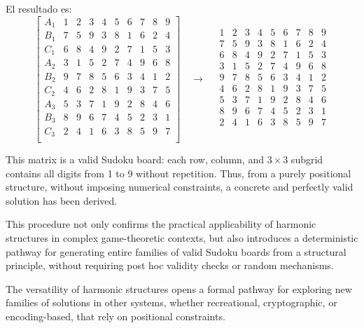 \documentclass{article}
\begin{document}
El resultado es:
\[
\left[
\begin{array}{r|ccccccccc}
A_1 & 1 & 2 & 3 & 4 & 5 & 6 & 7 & 8 & 9 \\
B_1 & 7 & 5 & 9 & 3 & 8 & 1 & 6 & 2 & 4 \\
C_1 & 6 & 8 & 4 & 9 & 2 & 7 & 1 & 5 & 3 \\
A_2 & 3 & 1 & 5 & 2 & 7 & 4 & 9 & 6 & 8 \\
B_2 & 9 & 7 & 8 & 5 & 6 & 3 & 4 & 1 & 2 \\
C_2 & 4 & 6 & 2 & 8 & 1 & 9 & 3 & 7 & 5 \\
A_3 & 5 & 3 & 7 & 1 & 9 & 2 & 8 & 4 & 6 \\
B_3 & 8 & 9 & 6 & 7 & 4 & 5 & 2 & 3 & 1 \\
C_3 & 2 & 4 & 1 & 6 & 3 & 8 & 5 & 9 & 7 \\
\end{array}
\right]
\quad
\longrightarrow
\quad
\begin{array}{ccc|ccc|ccc}
1 & 2 & 3 & 4 & 5 & 6 & 7 & 8 & 9 \\
7 & 5 & 9 & 3 & 8 & 1 & 6 & 2 & 4 \\
6 & 8 & 4 & 9 & 2 & 7 & 1 & 5 & 3 \\
\hline
3 & 1 & 5 & 2 & 7 & 4 & 9 & 6 & 8 \\
9 & 7 & 8 & 5 & 6 & 3 & 4 & 1 & 2 \\
4 & 6 & 2 & 8 & 1 & 9 & 3 & 7 & 5 \\
\hline
5 & 3 & 7 & 1 & 9 & 2 & 8 & 4 & 6 \\
8 & 9 & 6 & 7 & 4 & 5 & 2 & 3 & 1 \\
2 & 4 & 1 & 6 & 3 & 8 & 5 & 9 & 7 \\
\end{array}
\]
\medskip

This matrix is a valid Sudoku board: each row, column, and \(3 \times 3\) subgrid contains all digits from 1 to 9 without repetition. Thus, from a purely positional structure, without imposing numerical constraints, a concrete and perfectly valid solution has been derived.

\medskip

This procedure not only confirms the practical applicability of harmonic structures in complex game-theoretic contexts, but also introduces a deterministic pathway for generating entire families of valid Sudoku boards from a structural principle, without requiring post hoc validity checks or random mechanisms.

\medskip

The versatility of harmonic structures opens a formal pathway for exploring new families of solutions in other systems, whether recreational, cryptographic, or encoding-based, that rely on positional constraints.
\end{document}
